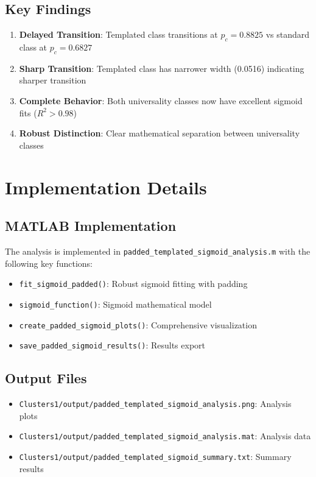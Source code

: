 \documentclass[11pt]{article}
\begin{document}
\subsection{Key Findings}

\begin{enumerate}
    \item \textbf{Delayed Transition}: Templated class transitions at $p_c = 0.8825$ vs standard class at $p_c = 0.6827$
    \item \textbf{Sharp Transition}: Templated class has narrower width (0.0516) indicating sharper transition
    \item \textbf{Complete Behavior}: Both universality classes now have excellent sigmoid fits ($R^2 > 0.98$)
    \item \textbf{Robust Distinction}: Clear mathematical separation between universality classes
\end{enumerate}

\section{Implementation Details}

\subsection{MATLAB Implementation}

The analysis is implemented in \texttt{padded\_templated\_sigmoid\_analysis.m} with the following key functions:

\begin{itemize}
    \item \texttt{fit\_sigmoid\_padded()}: Robust sigmoid fitting with padding
    \item \texttt{sigmoid\_function()}: Sigmoid mathematical model
    \item \texttt{create\_padded\_sigmoid\_plots()}: Comprehensive visualization
    \item \texttt{save\_padded\_sigmoid\_results()}: Results export
\end{itemize}

\subsection{Output Files}

\begin{itemize}
    \item \texttt{Clusters1/output/padded\_templated\_sigmoid\_analysis.png}: Analysis plots
    \item \texttt{Clusters1/output/padded\_templated\_sigmoid\_analysis.mat}: Analysis data
    \item \texttt{Clusters1/output/padded\_templated\_sigmoid\_summary.txt}: Summary results
\end{itemize}
\end{document}
